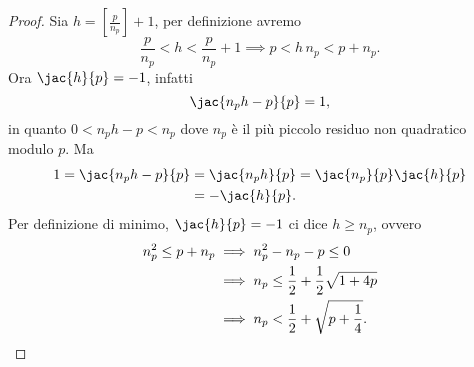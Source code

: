 \begin{proof}
	Sia \(h=\left[ \frac{p}{n_p} \right] +1\), per definizione avremo
	\[
		\frac{p}{n_p} < h < \frac{p}{n_p} + 1 \implies p < h\,n_p < p +n_p.
	\]
	Ora \(\jac{h}{p}=-1\), infatti
	\[
		\jac{n_ph-p}{p} = 1,
	\]
	in quanto \(0<n_p h-p<n_p\) dove \(n_p\) è il più piccolo residuo non quadratico modulo \(p\).
	Ma
	\[
		\begin{split}
			1 = \jac{n_p h-p}{p} & = \jac{n_p h}{p} = \jac{n_p}{p}\jac{h}{p}\\
			& = -\jac{h}{p}.
		\end{split}
	\]
	Per definizione di minimo, \(\jac{h}{p}=-1\) ci dice \(h\ge n_p\), ovvero
	\[
		\begin{split}
			n_p^2 \le p+n_p & \implies n_p^2 - n_p -p \le 0\\
			& \implies n_p \le \frac{1}{2}+\frac{1}{2}\sqrt{1+4p}\\
			& \implies n_p < \frac{1}{2}+\sqrt{p+\frac{1}{4}}.\qedhere
		\end{split}
	\]
\end{proof}